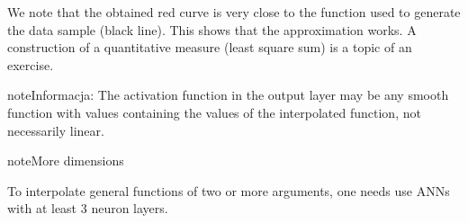 \documentclass[a4paper,12pt,polish]{jupyterBook}
\begin{document}
\begin{sphinxVerbatimInput}

\begin{sphinxVerbatim}[commandchars=\\\{\}]
                  
                      
        
\end{sphinxVerbatim}
\end{sphinxVerbatimInput}
\begin{sphinxVerbatimOutput}

\noindent{}
\end{sphinxVerbatimOutput}

\sphinxAtStartPar
We note that the obtained red curve is very close to the function used to generate the data sample (black line). This shows that the approximation works. A construction of a quantitative measure (least square sum) is a topic of an exercise.

\begin{sphinxadmonition}{note}{Informacja:}
\sphinxAtStartPar
The activation function in the output layer may be any smooth function with values containing the values of the interpolated function, not necessarily linear.
\end{sphinxadmonition}

\begin{sphinxadmonition}{note}{More dimensions}

\sphinxAtStartPar
To interpolate general functions of two or more arguments, one needs use ANNs with at least 3 neuron layers.
\end{sphinxadmonition}
\end{document}
